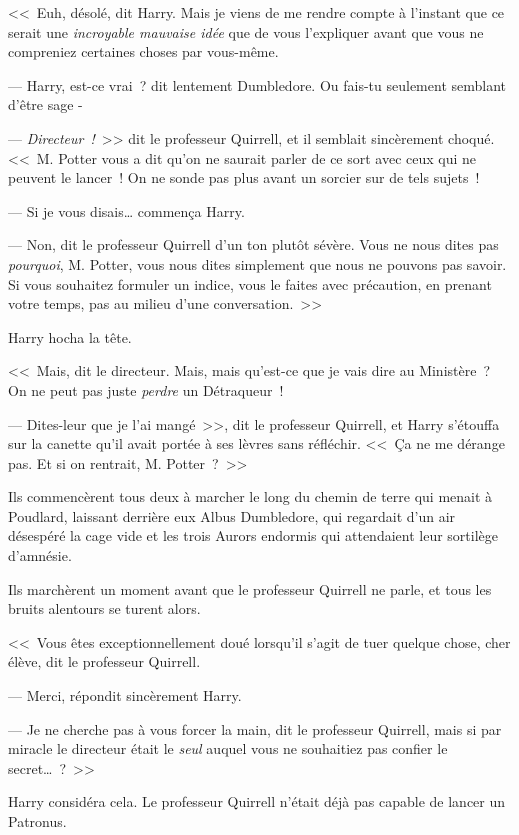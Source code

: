 <<~Euh, désolé, dit Harry. Mais je viens de me rendre compte à l'instant que ce serait une \emph{incroyable mauvaise idée} que de vous l'expliquer avant que vous ne compreniez certaines choses par vous-même.

--- Harry, est-ce vrai~? dit lentement Dumbledore. Ou fais-tu seulement semblant d'être sage -

--- \emph{Directeur~!}~>> dit le professeur Quirrell, et il semblait sincèrement choqué. <<~M. Potter vous a dit qu'on ne saurait parler de ce sort avec ceux qui ne peuvent le lancer~! On ne sonde pas plus avant un sorcier sur de tels sujets~!

--- Si je vous disais… commença Harry.

--- Non, dit le professeur Quirrell d'un ton plutôt sévère. Vous ne nous dites pas \emph{pourquoi}, M. Potter, vous nous dites simplement que nous ne pouvons pas savoir. Si vous souhaitez formuler un indice, vous le faites avec précaution, en prenant votre temps, pas au milieu d'une conversation.~>>

Harry hocha la tête.

<<~Mais, dit le directeur. Mais, mais qu'est-ce que je vais dire au Ministère~? On ne peut pas juste \emph{perdre} un Détraqueur~!

--- Dites-leur que je l'ai mangé~>>, dit le professeur Quirrell, et Harry s'étouffa sur la canette qu'il avait portée à ses lèvres sans réfléchir. <<~Ça ne me dérange pas. Et si on rentrait, M. Potter~?~>>

Ils commencèrent tous deux à marcher le long du chemin de terre qui menait à Poudlard, laissant derrière eux Albus Dumbledore, qui regardait d'un air désespéré la cage vide et les trois Aurors endormis qui attendaient leur sortilège d'amnésie.


Ils marchèrent un moment avant que le professeur Quirrell ne parle, et tous les bruits alentours se turent alors.

<<~Vous êtes exceptionnellement doué lorsqu'il s'agit de tuer quelque chose, cher élève, dit le professeur Quirrell.

--- Merci, répondit sincèrement Harry.

--- Je ne cherche pas à vous forcer la main, dit le professeur Quirrell, mais si par miracle le directeur était le \emph{seul} auquel vous ne souhaitiez pas confier le secret…~?~>>

Harry considéra cela. Le professeur Quirrell n'était déjà pas capable de lancer un Patronus.

